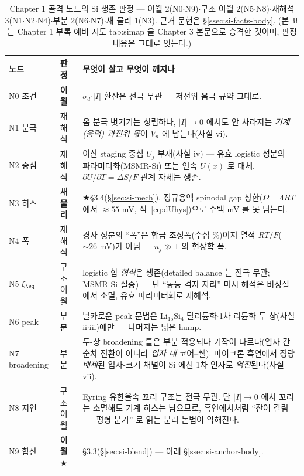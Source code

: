 \begin{table}[h]
\centering
\small
\begin{tabular}{p{} p{} p{}}
\toprule
노드 & 판정 & 무엇이 살고 무엇이 깨지나 \\
\midrule
N0 조건 & \textbf{이월} & $\sigma_d$$\cdot$$|I|$ 환산은 전극 무관 --- 저전위 음극 규약 그대로. \\
N1 분극 & 재해석 & 옴 분극 벗기기는 성립하나, $|I|\to0$ 에서도 안 사라지는 \emph{기계(응력) 과전위 몫}이 $V_n$ 에 남는다(사실 vi). \\
N2 중심 & 재해석 & 이산 staging 중심 $U_j$ 부재(사실 iv) --- 유효 logistic 성분의 파라미터화(MSMR-Si\cite{verbrugge_lisi2016}) 또는 연속 $U(x)$\cite{chevrier_dahn2009} 로 대체. $\partial U/\partial T=\Delta S/F$ 관계 자체는 생존. \\
N3 히스 & \textbf{새 물리} & ★§3.4(\S\ref{sec:si-mech}). 정규용액 spinodal gap 상한($\Omega{=}4RT$ 에서 $\approx55$ mV, 식~\eqref{eq:dUhys})으로 수백 mV 를 못 담는다. \\
N4 폭 & 재해석 & 경사 성분의 ``폭''은 합금 조성폭(수십 \%)이지 열적 $RT/F$($\sim26$ mV)가 아님 --- $n_j\gg1$ 의 현상학 폭. \\
N5 $\xi_\eq$ & 구조 이월 & logistic 합 \emph{형식}은 생존(detailed balance 는 전극 무관; MSMR-Si 실증\cite{verbrugge_lisi2016}) --- 단 ``동등 격자 자리'' 미시 해석은 비정질에서 소멸, 유효 파라미터화로 재해석. \\
N6 peak & 부분 & 날카로운 peak 문법은 Li$_{15}$Si$_4$ 탈리튬화$\cdot$1차 리튬화 두-상(사실 ii$\cdot$iii)에만 --- 나머지는 넓은 hump. \\
N7 broadening & 부분 & 두-상 broadening 틀은 부분 적용되나 기작이 다르다(입자 간 순차 전환이 아니라 \emph{입자 내} 코어--쉘). 마이크론 흑연에서 정량 \emph{배제}된 입자-크기 채널이 Si 에선 1차 인자로 \emph{역전}된다(사실 vii). \\
N8 지연 & 구조 이월 & Eyring 유한율속 꼬리 구조는 전극 무관. 단 $|I|\to0$ 에서 꼬리는 소멸해도 기계 히스는 남으므로, 흑연에서처럼 ``잔여 갈림 $=$ 평형 분기'' 로 읽는 분리 논법이 약해진다. \\
N9 합산 & \textbf{이월}★ & §3.3(\S\ref{sec:si-blend}) --- 아래 \S\ref{ssec:si-anchor-body}. \\
\bottomrule
\end{tabular}
\caption{Chapter 1 골격 노드의 Si 생존 판정 --- 이월 2(N0$\cdot$N9)$\cdot$구조 이월 2(N5$\cdot$N8)$\cdot$재해석
3(N1$\cdot$N2$\cdot$N4)$\cdot$부분 2(N6$\cdot$N7)$\cdot$새 물리 1(N3). 근거 문헌은 \S\ref{ssec:si-facts-body}.
(본 표는 Chapter 1 부록 예비 지도 tab:simap 을 Chapter 3 본문으로 승격한 것이며, 판정 내용은 그대로 잇는다.)}
\label{tab:si-survival}
\end{table}

